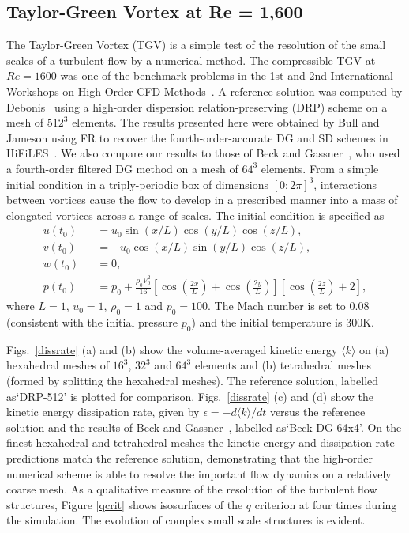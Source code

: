 \graphicspath{{figures_taylorgreen/}}%

\subsection{Taylor-Green Vortex at Re = 1,600}

The Taylor-Green Vortex (TGV) is a simple test of the resolution of the small scales of a turbulent flow by a numerical method.
The compressible TGV at $Re=1600$ was one of the benchmark problems in the 1st and 2nd International Workshops on High-Order CFD Methods~\cite{wang2013}.
A reference solution was computed by Debonis~\cite{debonis:13} using a high-order dispersion relation-preserving (DRP) scheme on a mesh of $512^3$ elements.
The results presented here were obtained by Bull and Jameson using FR to recover the fourth-order-accurate DG and SD schemes in HiFiLES~\cite{bull2013a,bull2014a}.
We also compare our results to those of Beck and Gassner~\cite{beck:12}, who used a fourth-order filtered DG method on a mesh of $64^3$ elements.
From a simple initial condition in a triply-periodic box of dimensions $[0:2\pi]^3$, interactions between vortices cause the flow to develop in a prescribed manner into a mass of elongated vortices across a range of scales.
The initial condition is specified as
%
\begin{eqnarray}\label{tgv}
u(t_0) &&= u_0 \sin (x/L) \cos (y/L) \cos (z/L), \\
v(t_0) &&= -u_0 \cos (x/L) \sin (y/L) \cos (z/L), \\
w(t_0) &&= 0, \\
p(t_0) &&= p_0 + \frac{\rho_0 V^2_0}{16} \left [ \cos \left (\frac{2x}{L} \right ) + \cos \left (\frac{2y}{L} \right ) \right ] \left [ \cos \left (\frac{2z}{L} \right ) + 2 \right ],
\end{eqnarray}
%
where $L = 1$, $u_0 = 1$, $\rho_0 = 1$ and $p_0 = 100$.
The Mach number is set to 0.08 (consistent with the initial pressure $p_0$) and the initial temperature is 300K.

Figs.~\ref{dissrate} (a) and (b) show the volume-averaged kinetic energy $\langle k \rangle$  on (a) hexahedral meshes of $16^3$, $32^3$ and $64^3$ elements and (b) tetrahedral meshes (formed by splitting the hexahedral meshes).
The reference solution, labelled as`DRP-512' is plotted for comparison.
Figs.~\ref{dissrate} (c) and (d) show the kinetic energy dissipation rate, given by $\epsilon = -d \langle k \rangle/dt$ versus the reference solution and the results of Beck and Gassner~\cite{beck:12}, labelled as`Beck-DG-64x4'.
On the finest hexahedral and tetrahedral meshes the kinetic energy and dissipation rate predictions match the reference solution, demonstrating that the high-order numerical scheme is able to resolve the important flow dynamics on a relatively coarse mesh.
As a qualitative measure of the resolution of the turbulent flow structures, Figure \ref{qcrit} shows isosurfaces of the $q$ criterion at four times during the simulation.
The evolution of complex small scale structures is evident.

